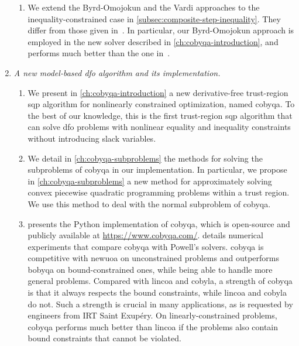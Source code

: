 \begin{enumerate}
\begin{enumerate}
        \item We extend the Byrd-Omojokun and the Vardi approaches to the inequality-constrained case in \cref{subsec:composite-step-inequality}.
        They differ from those given in~\cite[\S~15.4.4]{Conn_Gould_Toint_2000}.
        In particular, our Byrd-Omojokun approach is employed in the new solver described in \cref{ch:cobyqa-introduction}, and performs much better than the one in~\cite[\S~15.4.4]{Conn_Gould_Toint_2000}.
    \end{enumerate}
    \item \emph{A new model-based \gls{dfo} algorithm and its implementation.}
    \begin{enumerate}
        \item We present in \cref{ch:cobyqa-introduction} a new derivative-free trust-region \gls{sqp} algorithm for nonlinearly constrained optimization, named \gls{cobyqa}.
        To the best of our knowledge, this is the first trust-region \gls{sqp} algorithm that can solve \gls{dfo} problems with nonlinear equality and inequality constraints without introducing slack variables.
        \item We detail in \cref{ch:cobyqa-subproblems} the methods for solving the subproblems of \gls{cobyqa} in our implementation.
        In particular, we propose in \cref{ch:cobyqa-subproblems} a new method for approximately solving convex piecewise quadratic programming problems within a trust region.
        We use this method to deal with the normal subproblem of \gls{cobyqa}.
        \item {} presents the Python implementation of \gls{cobyqa}, which is open-source and publicly available at \url{https://www.cobyqa.com/}.
         details numerical experiments that compare \gls{cobyqa} with Powell's solvers.
        \Gls{cobyqa} is competitive with \gls{newuoa} on unconstrained problems and outperforms \gls{bobyqa} on bound-constrained ones, while being able to handle more general problems.
        Compared with \gls{lincoa} and \gls{cobyla}, a strength of \gls{cobyqa} is that it always respects the bound constraints, while \gls{lincoa} and \gls{cobyla} do not.
        Such a strength is crucial in many applications, as is requested by engineers from IRT Saint Exup{\'{e}}ry.
        On linearly-constrained problems, \gls{cobyqa} performs much better than \gls{lincoa} if the problems also contain bound constraints that cannot be violated.

\end{enumerate}
\end{enumerate}
